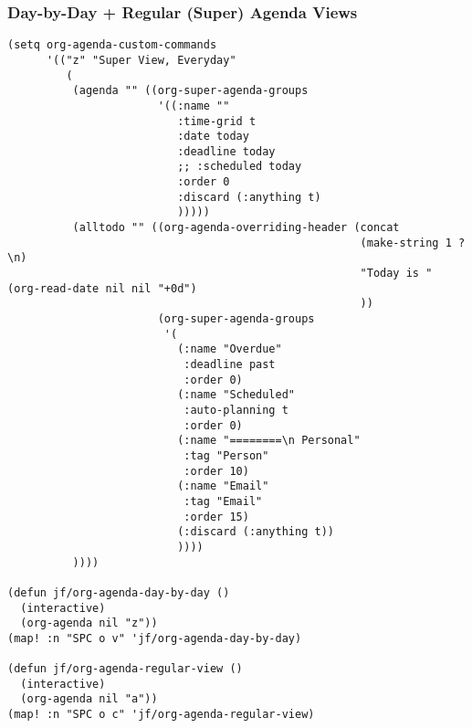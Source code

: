 \documentclass[8pt]{article}
\begin{document}
\subsubsection{Day-by-Day + Regular (Super) Agenda Views}
\label{sec:org76a9f78}
\begin{verbatim}
(setq org-agenda-custom-commands
      '(("z" "Super View, Everyday"
         (
          (agenda "" ((org-super-agenda-groups
                       '((:name ""
                          :time-grid t
                          :date today
                          :deadline today
                          ;; :scheduled today
                          :order 0
                          :discard (:anything t)
                          )))))
          (alltodo "" ((org-agenda-overriding-header (concat
                                                      (make-string 1 ?\n)
                                                      "Today is " (org-read-date nil nil "+0d")
                                                      ))
                       (org-super-agenda-groups
                        '(
                          (:name "Overdue"
                           :deadline past
                           :order 0)
                          (:name "Scheduled"
                           :auto-planning t
                           :order 0)
                          (:name "========\n Personal"
                           :tag "Person"
                           :order 10)
                          (:name "Email"
                           :tag "Email"
                           :order 15)
                          (:discard (:anything t))
                          ))))
          ))))

(defun jf/org-agenda-day-by-day ()
  (interactive)
  (org-agenda nil "z"))
(map! :n "SPC o v" 'jf/org-agenda-day-by-day)

(defun jf/org-agenda-regular-view ()
  (interactive)
  (org-agenda nil "a"))
(map! :n "SPC o c" 'jf/org-agenda-regular-view)
\end{verbatim}
\end{document}
